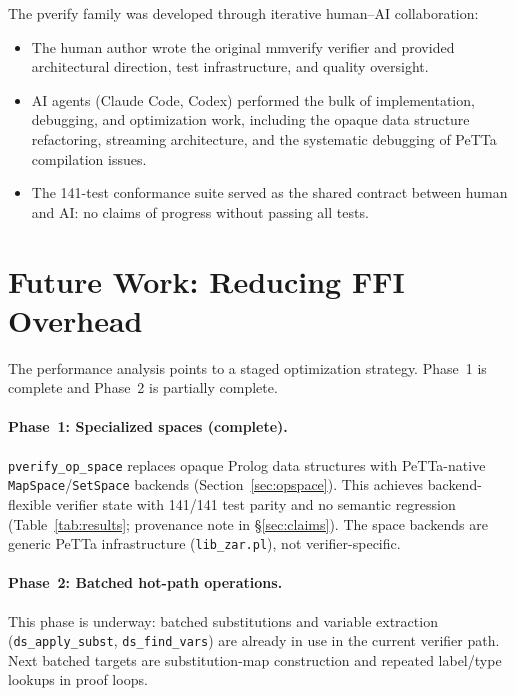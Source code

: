 \documentclass[11pt]{article}
\begin{document}
The pverify family was developed through iterative human--AI
collaboration:
\begin{itemize}[leftmargin=2em]
  \item The human author wrote the original mmverify verifier and
    provided architectural direction, test infrastructure, and
    quality oversight.
  \item AI agents (Claude Code, Codex) performed the bulk of
    implementation, debugging, and optimization work, including
    the opaque data structure refactoring, streaming architecture,
    and the systematic debugging of PeTTa compilation issues.
  \item The 141-test conformance suite served as the shared
    contract between human and AI: no claims of progress without
    passing all tests.
\end{itemize}

\section{Future Work: Reducing FFI Overhead}
\label{sec:future}

The performance analysis points to a staged optimization strategy.
Phase~1 is complete and Phase~2 is partially complete.

\paragraph{Phase~1: Specialized spaces (complete).}
\texttt{pverify\_op\_space} replaces opaque Prolog data structures
with PeTTa-native \texttt{MapSpace}/\texttt{SetSpace} backends
(Section~\ref{sec:opspace}).  This achieves backend-flexible
verifier state with 141/141 test parity and no semantic regression
(Table~\ref{tab:results}; provenance note in \S\ref{sec:claims}).
The space backends are generic PeTTa infrastructure
(\texttt{lib\_zar.pl}), not verifier-specific.

\paragraph{Phase~2: Batched hot-path operations.}
This phase is underway: batched substitutions and variable extraction
(\texttt{ds\_apply\_subst}, \texttt{ds\_find\_vars}) are already in
use in the current verifier path.
Next batched targets are substitution-map construction and repeated
label/type lookups in proof loops.
\end{document}
